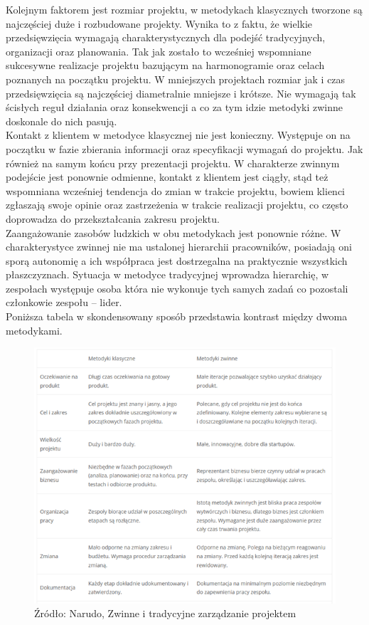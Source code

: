 \documentclass[oneside,polski,logo]{amuthesis}
\begin{document}
Kolejnym faktorem jest rozmiar projektu, w metodykach klasycznych tworzone są najczęściej duże i rozbudowane projekty. Wynika to z faktu, że wielkie przedsięwzięcia wymagają charakterystycznych dla podejść tradycyjnych, organizacji oraz planowania. Tak jak zostało to wcześniej wspomniane sukcesywne realizacje projektu bazującym na harmonogramie oraz celach poznanych na początku projektu. W mniejszych projektach rozmiar jak i czas przedsięwzięcia są najczęściej diametralnie mniejsze i krótsze. Nie wymagają tak ścisłych reguł działania oraz konsekwencji a co za tym idzie metodyki zwinne doskonale do nich pasują.\\

Kontakt z klientem w metodyce klasycznej nie jest konieczny. Występuje on na początku w fazie zbierania informacji oraz specyfikacji wymagań do projektu. Jak również na samym końcu przy prezentacji projektu. W charakterze zwinnym podejście jest ponownie odmienne, kontakt z klientem jest ciągły, stąd też wspomniana wcześniej tendencja do zmian w trakcie projektu, bowiem klienci zgłaszają swoje opinie oraz zastrzeżenia w trakcie realizacji projektu, co często doprowadza do przekształcania zakresu projektu.\\

Zaangażowanie zasobów ludzkich w obu metodykach jest ponownie różne. W charakterystyce zwinnej nie ma ustalonej hierarchii pracowników, posiadają oni sporą autonomię a ich współpraca jest dostrzegalna na praktycznie wszystkich płaszczyznach. Sytuacja w metodyce tradycyjnej wprowadza hierarchię, w zespołach występuje osoba która nie wykonuje tych samych zadań co pozostali członkowie zespołu – lider. \cite{modele}\cite{agileVwaterfall}\\

Poniższa tabela w skondensowany sposób przedstawia kontrast między dwoma metodykami.\\

\begin{figure}[h]
	\centering
	\includegraphics[width=15cm]{images/hyps/zwinne-tradycyjne.png}
	\caption{Źródło: Narudo, Zwinne i tradycyjne zarządzanie projektem}
\end{figure}
\end{document}
